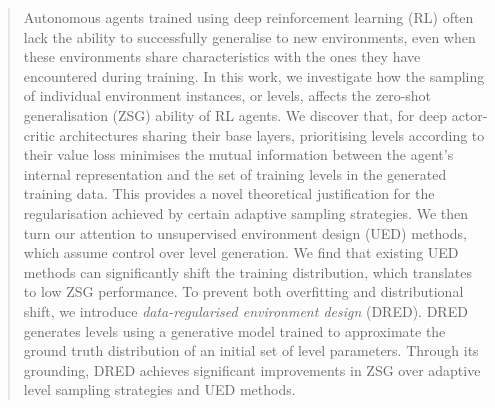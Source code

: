 \documentclass{article}
\theoremstyle{plain}
\theoremstyle{definition}
\theoremstyle{remark}
\begin{document}
\printAffiliationsAndNotice{}  %



\begin{abstract}
Autonomous agents trained using deep reinforcement learning (RL) often lack the ability to successfully generalise to new environments, even when these environments share characteristics with the ones they have encountered during training. In this work, we investigate how the sampling of individual environment instances, or levels, affects the zero-shot generalisation (ZSG) ability of RL agents. We discover that, for deep actor-critic architectures sharing their base layers, prioritising levels according to their value loss minimises the mutual information between the agent's internal representation and the set of training levels in the generated training data. This provides a novel theoretical justification for the regularisation achieved by certain adaptive sampling strategies. We then turn our attention to unsupervised environment design (UED) methods, which assume control over level generation. We find that existing UED methods can significantly shift the training distribution, which translates to low ZSG performance. To prevent both overfitting and distributional shift, we introduce \textit{data-regularised environment design} (DRED). DRED generates levels using a generative model trained to approximate the ground truth distribution of an initial set of level parameters. Through its grounding, DRED achieves significant improvements in ZSG over adaptive level sampling strategies and UED methods.
\end{abstract}
\end{document}
